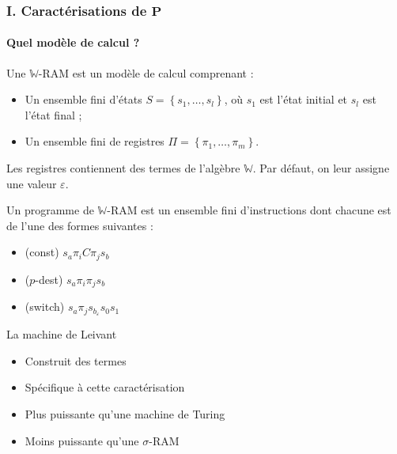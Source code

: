 \documentclass[10pt]{beamer}
\newcommand{\bbW}{\mathbb{W}}
\begin{document}
	
	
	
	\begin{frame}
		\frametitle{I. Caractérisations de $\textbf{P}$}
		\framesubtitle{Quel modèle de calcul ?}
		
		\begin{defn}
			
			Une $\bbW$-RAM est un modèle de calcul comprenant :
			\begin{itemize}[itemsep=-1mm]
				\item 	Un ensemble fini d'états $S = \left\lbrace s_1, \dots, s_l \right\rbrace$, où $s_1$ est l'état initial et $s_l$ est l'état final ;
				\item 	Un ensemble fini de registres $\Pi = \left\lbrace \pi_1, \dots, \pi_m \right\rbrace$.
			\end{itemize}
			
			Les registres contiennent des termes de l'algèbre $\bbW$. Par défaut, on leur assigne une valeur $\varepsilon$.
			
			Un programme de $\bbW$-RAM est un ensemble fini d'instructions dont chacune est de l'une des formes suivantes :
			
			\begin{itemize}[itemsep=-1mm]
				\item 	(const)			$s_a \pi_{i} C \pi_j s_b$
				\item	($p$-dest)		$s_a \pi_i \pi_j s_b$
				\item	(switch)		$s_a \pi_j s_{b_{\varepsilon}} s_{0} s_{1}$
			\end{itemize}
		\end{defn}
	\end{frame}
	
	
	\begin{frame}
		\begin{block}{La machine de Leivant}
			\begin{itemize}
				\item 	Construit des termes
				\item 	Spécifique à cette caractérisation
				\item 	Plus puissante qu'une machine de Turing
				\item 	Moins puissante qu'une $\sigma$-RAM %
			\end{itemize}
		\end{block}
	\end{frame}
	
\end{document}
